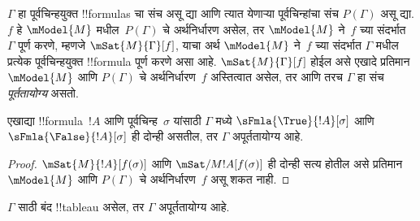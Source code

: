 \documentclass[../../../include/open-logic-section]{subfiles}
\begin{document}
\begin{defn}
  $\Gamma$ हा पूर्वचिन्हयुक्त !!{formula}s चा
  संच असू द्या आणि त्यात येणाऱ्या पूर्वचिन्हांचा
  संच $P(\Gamma)$ असू द्या. $f$ हे $\mModel{M}$
  मधील~$P(\Gamma)$ चे अर्थनिर्धारण असेल, तर
  $\mModel{M}$ ने~$f$ च्या संदर्भात~$\Gamma$
  पूर्ण करणे, म्हणजे $\mSat{M}{\Gamma}[f]$,
  याचा अर्थ $\mModel{M}$ ने~$f$ च्या संदर्भात
  $\Gamma$ मधील प्रत्येक पूर्वचिन्हयुक्त !!{formula}
  पूर्ण करणे असा आहे. $\mSat{M}{\Gamma}[f]$
  होईल असे एखादे प्रतिमान~$\mModel{M}$ आणि
  $P(\Gamma)$ चे अर्थनिर्धारण~$f$ अस्तित्वात असेल,
  तर आणि तरच $\Gamma$ हा संच \emph{पूर्ततायोग्य} असतो.
\end{defn}

\begin{prop}
  एखाद्या !!{formula}~$!A$ आणि पूर्वचिन्ह~$\sigma$
  यांसाठी $\Gamma$ मध्ये
  $\sFmla{\True}{!A}[\sigma]$ आणि
  $\sFmla{\False}{!A}[\sigma]$ ही दोन्ही असतील,
  तर $\Gamma$ अपूर्ततायोग्य आहे.
\end{prop}

\begin{proof}
  $\mSat{M}{!A}[f(\sigma)]$ आणि
  $\mSat/{M}{!A}[f(\sigma)]$ ही दोन्ही सत्य होतील
  असे प्रतिमान~$\mModel{M}$ आणि $P(\Gamma)$ चे
  अर्थनिर्धारण~$f$ असू शकत नाही.
\end{proof}

\begin{thm}[निर्दोषता]
  $\Gamma$ साठी बंद !!{tableau} असेल, तर
  $\Gamma$ अपूर्ततायोग्य आहे.
\end{thm}
\end{document}
